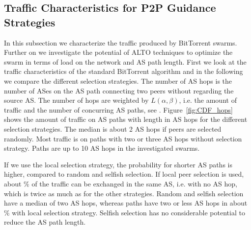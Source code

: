 \subsection{Traffic Characteristics for P2P Guidance Strategies}
In this subsection we characterize the traffic produced by BitTorrent swarms. Further on we investigate the potential of ALTO techniques to optimize the swarm in terms of load on the network and AS path length.
First we look at the traffic characteristics of the standard BitTorrent algorithm and in the following we compare the different selection strategies.
The number of AS hops is the number of ASes on the AS path connecting two peers without regarding the source AS. The number of hops are weighted by $L(\alpha,\beta)$, i.e. the amount of traffic and the number of concurring AS paths, see . Figure~\ref{fig:CDF_hops} shows the amount of traffic on AS paths with length in AS hops for the different selection strategies. The median is about 2 AS hops if peers are selected randomly. Most traffic is on paths with two or three AS hops without selection strategy. Paths are up to 10 AS hops in the investigated swarms.




If we use the local selection strategy, the probability for shorter AS paths is higher, compared to random and selfish selection. If local peer selection is used, about \unit[20]{\%} of the traffic can be exchanged in the same AS, i.e. with no AS hop, which is twice as much as for the other strategies. Random and selfish selection have a median of two AS hops, whereas paths have two or less AS hops in about \unit[80]{\%} with local selection strategy. Selfish selection has no considerable potential to reduce the AS path length.

